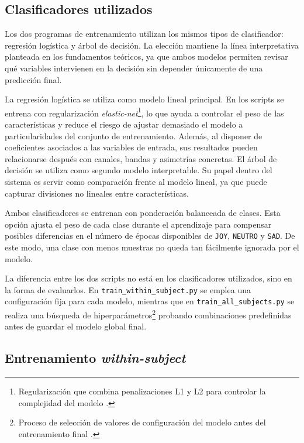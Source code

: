 \subsection{Clasificadores utilizados}

Los dos programas de entrenamiento utilizan los mismos tipos de clasificador: regresión logística y árbol de decisión. La elección mantiene la línea interpretativa planteada en los fundamentos teóricos, ya que ambos modelos permiten revisar qué variables intervienen en la decisión sin depender únicamente de una predicción final.

La regresión logística se utiliza como modelo lineal principal. En los scripts se entrena con regularización \textit{elastic-net}\footnote{Regularización que combina penalizaciones L1 y L2 para controlar la complejidad del modelo \cite{wikipediaElasticNet}.}, lo que ayuda a controlar el peso de las características y reduce el riesgo de ajustar demasiado el modelo a particularidades del conjunto de entrenamiento. Además, al disponer de coeficientes asociados a las variables de entrada, sus resultados pueden relacionarse después con canales, bandas y asimetrías concretas. El árbol de decisión se utiliza como segundo modelo interpretable. Su papel dentro del sistema es servir como comparación frente al modelo lineal, ya que puede capturar divisiones no lineales entre características.

Ambos clasificadores se entrenan con ponderación balanceada de clases. Esta opción ajusta el peso de cada clase durante el aprendizaje para compensar posibles diferencias en el número de épocas disponibles de \texttt{JOY}, \texttt{NEUTRO} y \texttt{SAD}. De este modo, una clase con menos muestras no queda tan fácilmente ignorada por el modelo.

La diferencia entre los dos scripts no está en los clasificadores utilizados, sino en la forma de evaluarlos. En \texttt{train\_within\_subject.py} se emplea una configuración fija para cada modelo, mientras que en \texttt{train\_all\_subjects.py} se realiza una búsqueda de hiperparámetros\footnote{Proceso de selección de valores de configuración del modelo antes del entrenamiento final \cite{wikipediaHyperparameterOptimization}.} probando combinaciones predefinidas antes de guardar el modelo global final.

\subsection{Entrenamiento \textit{within-subject}}

